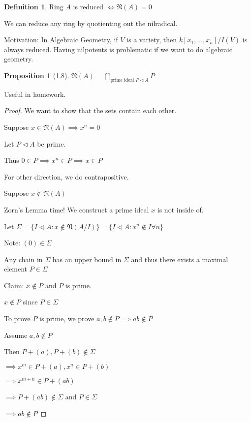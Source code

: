 \documentclass{article}
\theoremstyle{definition}
\newtheorem{definition}{Definition}
\newtheorem{proposition}{Proposition}
\begin{document}
\begin{definition}
    Ring \(A\) is reduced \(\iff \mathfrak{N}(A)=0 \) 
\end{definition}

We can reduce any ring by quotienting out the nilradical.

Motivation: In Algebraic Geometry, if \(V\) is a variety, then \(k[x_1, \dots, x_n ] / I(V)\) is always reduced. Having nilpotents is problematic if we want to do algebraic geometry. 

\begin{proposition}
    [1.8] \(\displaystyle \mathfrak{N}(A) = \bigcap_{\text{prime ideal } P\triangleleft A}^{} P \) 
\end{proposition}

Useful in homework.

\begin{proof}
    We want to show that the sets contain each other.

    Suppose \(x\in \mathfrak{N}(A) \implies x^n =0\)
    
    Let \(P \triangleleft A\) be prime.

    Thus \(0\in P\implies x^n\in P\implies x\in P\) 

    For other direction, we do contrapositive.

    Suppose \(x\notin \mathfrak{N}(A) \)
    
    Zorn's Lemma time! We construct a prime ideal \(x\) is not inside of.

    Let \(\Sigma = \{ I \triangleleft A : \overline{x} \notin \mathfrak{N}(A / I)  \} = \{ I \triangleleft A : x^n \notin I \forall n \}  \) 

    Note: \((0) \in \Sigma\) 

    Any chain in \(\Sigma \) has an upper bound in \(\Sigma\) and thus there exists a maximal element \(P \in \Sigma\) 

    Claim: \(x\notin P\) and \(P\) is prime.

    \(x\notin P\) since \(P\in \Sigma\) 

    To prove \(P\) is prime, we prove \(a,b\notin P\implies ab\notin P\) 

    Assume \(a,b\notin P\) 

    Then \(P+(a),P+(b)\notin \Sigma \) 

    \(\implies x^m \in P + (a), x^n \in P + (b)\) 

    \(\implies x^{m+n} \in P + (ab) \) 

    \(\implies P + (ab) \notin \Sigma\) and \(P \in \Sigma \) 

    \(\implies ab\notin P\) 

\end{proof}
\end{document}
